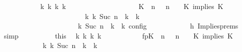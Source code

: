 \begin{isabellebody}
\ \ \ \ \ \ \ \ \isamarkupfalse%
\ \isamarkupfalse%
\ {\isacartoucheopen}{\isasymexists}{\isasymGamma}\isactrlsub k\ {\isasymPsi}\isactrlsub k\ {\isasymPhi}\isactrlsub k\ k{\isachardot}\isanewline
\ \ \ \ \ \ \ \ \ \ \ \ \ \ \ \ \ \ \ \ {\isacharparenleft}{\isacharparenleft}{\isacharparenleft}{\isacharparenleft}K\ {\isasymnot}{\isasymUp}\ n{\isacharparenright}\ {\isacharhash}\ {\isasymGamma}{\isacharparenright}{\isacharcomma}\ n\ {\isasymturnstile}\ {\isasymPsi}\ {\isasymtriangleright}\ {\isacharparenleft}{\isacharparenleft}K\ implies\ K\ {\isacharhash}\ {\isasymPhi}{\isacharparenright}{\isacharparenright}\isanewline
\ \ \ \ \ \ \ \ \ \ \ \ \ \ \ \ \ \ \ \ \ \ \ \ {\isasymhookrightarrow}\isactrlbsup k\isactrlesup \ {\isacharparenleft}{\isasymGamma}\isactrlsub k{\isacharcomma}\ Suc\ n\ {\isasymturnstile}\ {\isasymPsi}\isactrlsub k\ {\isasymtriangleright}\ {\isasymPhi}\isactrlsub k{\isacharparenright}{\isacharparenright}\isanewline
\ \ \ \ \ \ \ \ \ \ \ \ \ \ \ \ \ \ {\isasymand}\ {\isasymrho}\ {\isasymin}\ {\isasymlbrakk}\ {\isasymGamma}\isactrlsub k{\isacharcomma}\ Suc\ n\ {\isasymturnstile}\ {\isasymPsi}\isactrlsub k\ {\isasymtriangleright}\ {\isasymPhi}\isactrlsub k\ {\isasymrbrakk}\isactrlsub c\isactrlsub o\isactrlsub n\isactrlsub f\isactrlsub i\isactrlsub g{\isacartoucheclose}\isanewline
\ \ \ \ \ \ \ \ \ \ \isamarkupfalse%
\ h{}\ Implies{\isachardot}prems\ \isamarkupfalse%
\ simp\isanewline
\ \ \ \ \ \ \ \ \isamarkupfalse%
\ this\ \isamarkupfalse%
\ {\isasymGamma}\isactrlsub k\ {\isasymPsi}\isactrlsub k\ {\isasymPhi}\isactrlsub k\ k\ \isanewline
\ \ \ \ \ \ \ \ \ \ fp{\isacharcolon}{\isacartoucheopen}{\isacharparenleft}{\isacharparenleft}{\isacharparenleft}{\isacharparenleft}K\ {\isasymnot}{\isasymUp}\ n{\isacharparenright}\ {\isacharhash}\ {\isasymGamma}{\isacharparenright}{\isacharcomma}\ n\ {\isasymturnstile}\ {\isasymPsi}\ {\isasymtriangleright}\ {\isacharparenleft}{\isacharparenleft}K\ implies\ K\ {\isacharhash}\ {\isasymPhi}{\isacharparenright}{\isacharparenright}\isanewline
\ \ \ \ \ \ \ \ \ \ \ \ {\isasymhookrightarrow}\isactrlbsup k\isactrlesup \ {\isacharparenleft}{\isasymGamma}\isactrlsub k{\isacharcomma}\ Suc\ n\ {\isasymturnstile}\ {\isasymPsi}\isactrlsub k\ {\isasymtriangleright}\ {\isasymPhi}\isactrlsub k{\isacharparenright}{\isacharparenright}{\isacartoucheclose}\isanewline

\end{isabellebody}
